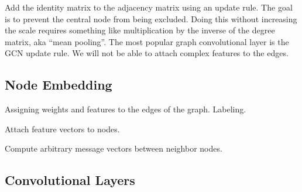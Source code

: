 Add the identity matrix to the adjacency matrix using an update rule.
The goal is to prevent the central node from being excluded. Doing this without increasing the scale requires something like multiplication by the inverse of the degree matrix, aka ``mean pooling''. The
most popular graph convolutional layer is the GCN update rule. We will not be able to attach complex features to the edges.

\subsection{\label{sec:embedding}Node Embedding}

\justifying
Assigning weights and features to the edges of the graph. Labeling.

Attach feature vectors to nodes.

Compute arbitrary message vectors between neighbor nodes.

\subsection{\label{sec:conv}Convolutional Layers}